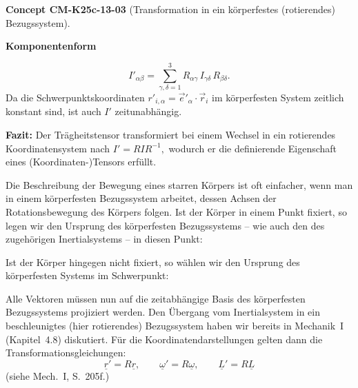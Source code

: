 \documentclass[10pt, letterpaper]{article}
\newcommand{\CustomHeading}[3]{%
  \par\medskip\noindent%
  \textbf{#1 #2} \textnormal{(#3)}.\enskip%
}
\newenvironment{CONC}[2]{\begin{unitbox}\CustomHeading{Concept}{#1}{#2}}{\end{unitbox}}
\begin{document}
\begin{CONC}{CM-K25c-13-03}{Transformation in ein körperfestes (rotierendes) Bezugssystem}
\textbf{Komponentenform}

\[
  I'_{\alpha\beta}
  =\sum_{\gamma,\delta=1}^{3}
     R_{\alpha\gamma}\,I_{\gamma\delta}\,R_{\beta\delta}.
\]
Da die Schwerpunktskoordinaten $r'_{i,\alpha}
=\vec e'_\alpha\!\cdot\!\vec r_i$ im körperfesten System zeitlich
konstant sind, ist auch $I'$ zeitunabhängig.

\vspace{0.5em}

\noindent
\textbf{Fazit:}  
Der Trägheitstensor transformiert bei einem Wechsel in ein rotierendes
Koordinatensystem nach
\(
  I'\!=\!RIR^{-1},
\)
wodurch er die definierende Eigenschaft eines (Koordinaten-)Tensors
erfüllt.
\end{CONC}



Die Beschreibung der Bewegung eines starren Körpers ist oft einfacher, wenn man in einem körperfesten Bezugssystem arbeitet, dessen Achsen der Rotationsbewegung des Körpers folgen. Ist der Körper in einem Punkt fixiert, so legen wir den Ursprung des körperfesten Bezugssystems – wie auch den des zugehörigen Inertialsystems – in diesen Punkt:

\begin{center}
\end{center}

Ist der Körper hingegen nicht fixiert, so wählen wir den Ursprung des körperfesten Systems im Schwerpunkt:

\begin{center}
\end{center}

Alle Vektoren müssen nun auf die zeitabhängige Basis des körperfesten Bezugssystems projiziert werden. Den Übergang vom Inertialsystem in ein beschleunigtes (hier rotierendes) Bezugssystem haben wir bereits in Mechanik~I (Kapitel~4.8) diskutiert. Für die Koordinatendarstellungen gelten dann die Transformationsgleichungen:
\[
\underline{r}' = R \underline{r}, \qquad
\underline{\omega}' = R \underline{\omega}, \qquad
\underline{L}' = R \underline{L}
\]
(siehe Mech.~I, S.~205f.)
\end{document}
